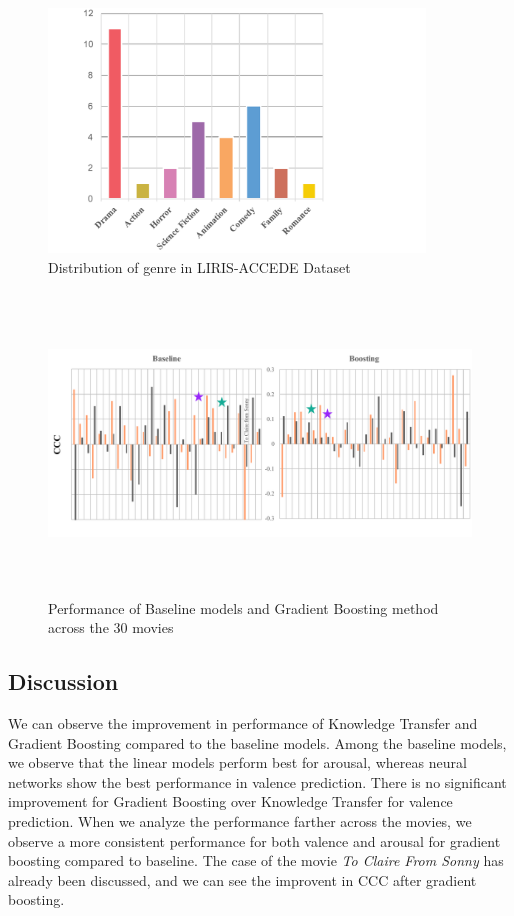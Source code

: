 \documentclass{article}
\begin{document}
\begin{figure}[h]
\includegraphics[width=10cm]{genre}
\centering
\caption{Distribution of genre in LIRIS-ACCEDE Dataset}
\label{genre}
\end{figure}

\begin{figure}[h]
\includegraphics[width=\textwidth, height = 8cm]{comparison}
\centering
\caption{Performance of Baseline models and Gradient Boosting method across the 30 movies}
\label{comparison}
\end{figure}

\subsection{Discussion}
We can observe the improvement in performance of Knowledge Transfer and Gradient Boosting compared to the baseline models. Among the baseline models, we observe that the linear models perform best for arousal, whereas neural networks show the best performance in valence prediction. There is no significant improvement for Gradient Boosting over Knowledge Transfer for valence prediction. When we analyze the performance farther across the movies, we observe a more consistent performance for both valence and arousal for gradient boosting compared to baseline. The case of the movie \textit{To Claire From Sonny} has already been discussed, and we can see the improvent in CCC after gradient boosting.
\end{document}
